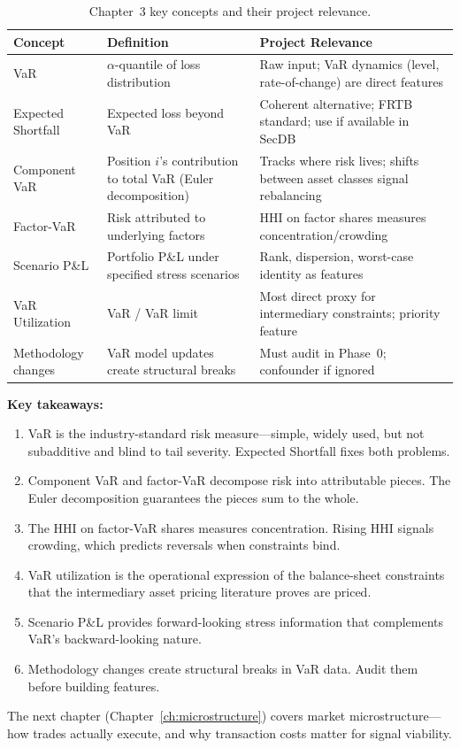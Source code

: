 \begin{table}[h]
\centering
\small
\begin{tabular}{@{}p{3.5cm}p{4cm}p{6cm}@{}}
\toprule
\textbf{Concept} & \textbf{Definition} & \textbf{Project Relevance} \\
\midrule
VaR &
  $\alpha$-quantile of loss distribution &
  Raw input; VaR dynamics (level, rate-of-change) are direct features \\[6pt]

Expected Shortfall &
  Expected loss beyond VaR &
  Coherent alternative; FRTB standard; use if available in SecDB \\[6pt]

Component VaR &
  Position $i$'s contribution to total VaR (Euler decomposition) &
  Tracks where risk lives; shifts between asset classes signal
  rebalancing \\[6pt]

Factor-VaR &
  Risk attributed to underlying factors &
  HHI on factor shares measures concentration/crowding \\[6pt]

Scenario P\&L &
  Portfolio P\&L under specified stress scenarios &
  Rank, dispersion, worst-case identity as features \\[6pt]

VaR Utilization &
  VaR / VaR limit &
  Most direct proxy for intermediary constraints; priority
  feature \\[6pt]

Methodology changes &
  VaR model updates create structural breaks &
  Must audit in Phase~0; confounder if ignored \\
\bottomrule
\end{tabular}
\caption{Chapter~3 key concepts and their project relevance.}
\label{tab:ch3-summary}
\end{table}

\vspace{1em}

\noindent\textbf{Key takeaways:}
\begin{enumerate}[nosep]
  \item VaR is the industry-standard risk measure---simple, widely used,
        but not subadditive and blind to tail severity.  Expected Shortfall
        fixes both problems.
  \item Component VaR and factor-VaR decompose risk into attributable
        pieces.  The Euler decomposition guarantees the pieces sum to the
        whole.
  \item The HHI on factor-VaR shares measures concentration.  Rising HHI
        signals crowding, which predicts reversals when constraints bind.
  \item VaR utilization is the operational expression of the balance-sheet
        constraints that the intermediary asset pricing literature proves
        are priced.
  \item Scenario P\&L provides forward-looking stress information that
        complements VaR's backward-looking nature.
  \item Methodology changes create structural breaks in VaR data.  Audit
        them before building features.
\end{enumerate}

\noindent The next chapter (Chapter~\ref{ch:microstructure}) covers
market microstructure---how trades actually execute, and why
transaction costs matter for signal viability.

